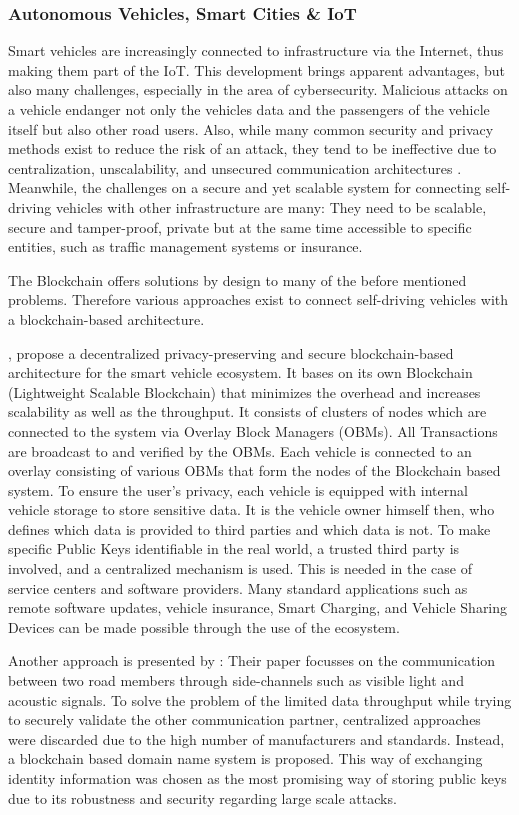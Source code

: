 \subsubsection{Autonomous Vehicles, Smart Cities \& IoT}
Smart vehicles are increasingly connected to infrastructure via the Internet, thus making them part of the IoT. This development brings apparent advantages, but also many challenges, especially in the area of cybersecurity. Malicious attacks on a vehicle endanger not only the vehicles data and the passengers of the vehicle itself but also other road users. Also, while many common security and privacy methods exist to reduce the risk of an attack, they tend to be ineffective due to centralization, unscalability, and unsecured communication architectures \cite{DorriSteger2017}.
Meanwhile, the challenges on a secure and yet scalable system for connecting self-driving vehicles with other infrastructure are many: They need to be scalable, secure and tamper-proof, private but at the same time accessible to specific entities, such as traffic management systems or insurance.

The Blockchain offers solutions by design to many of the before mentioned problems. Therefore various approaches exist to connect self-driving vehicles with a blockchain-based architecture.

\citeauthor{DorriSteger2017}, propose a decentralized privacy-preserving and secure blockchain-based architecture for the smart vehicle ecosystem. It bases on its own Blockchain (Lightweight Scalable Blockchain) that minimizes the overhead and increases scalability as well as the throughput.
It consists of clusters of nodes which are connected to the system via Overlay Block Managers (OBMs).  All Transactions are broadcast to and verified by the OBMs. Each vehicle is connected to an overlay consisting of various OBMs that form the nodes of the Blockchain based system.
To ensure the user's privacy, each vehicle is equipped with internal vehicle storage to store sensitive data. It is the vehicle owner himself then, who defines which data is provided to third parties and which data is not.
To make specific Public Keys identifiable in the real world, a trusted third party is involved, and a centralized mechanism is used. This is needed in the case of service centers and software providers.
Many standard applications such as remote software updates, vehicle insurance, Smart Charging, and Vehicle Sharing Devices can be made possible through the use of the ecosystem.

Another approach is presented by \citeauthor{Rowan2017}: Their paper focusses on the communication between two road members through side-channels such as visible light and acoustic signals. To solve the problem of the limited data throughput while trying to securely validate the other communication partner, centralized approaches were discarded due to the high number of manufacturers and standards. Instead, a blockchain based domain name system is proposed. This way of exchanging identity information was chosen as the most promising way of storing public keys due to its robustness and security regarding large scale attacks.


